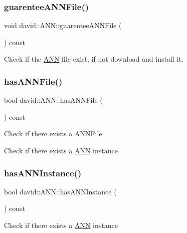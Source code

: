 \subsubsection{\texorpdfstring{guarentee\+A\+N\+N\+File()}{guarenteeANNFile()}}
{\footnotesize\ttfamily void david\+::\+A\+N\+N\+::guarentee\+A\+N\+N\+File (\begin{DoxyParamCaption}{ }\end{DoxyParamCaption}) const}

Check if the \hyperlink{classdavid_1_1ANN}{A\+NN} file exist, if not download and install it. \mbox{\label{classdavid_1_1ANN_a41cd1506fa1d9c4a92f356689ba3160e}} 
\subsubsection{\texorpdfstring{has\+A\+N\+N\+File()}{hasANNFile()}}
{\footnotesize\ttfamily bool david\+::\+A\+N\+N\+::has\+A\+N\+N\+File (\begin{DoxyParamCaption}{ }\end{DoxyParamCaption}) const}

Check if there exists a A\+N\+N\+File

Check if there exists a \hyperlink{classdavid_1_1ANN}{A\+NN} instance \mbox{\label{classdavid_1_1ANN_a0e3b3e683ad786e3ac5f08e26ddcd4ce}} 
\subsubsection{\texorpdfstring{has\+A\+N\+N\+Instance()}{hasANNInstance()}}
{\footnotesize\ttfamily bool david\+::\+A\+N\+N\+::has\+A\+N\+N\+Instance (\begin{DoxyParamCaption}{ }\end{DoxyParamCaption}) const}

Check if there exists a \hyperlink{classdavid_1_1ANN}{A\+NN} instance \mbox{\label{classdavid_1_1ANN_a5a25f7fb14c8681f7fcbda5d447b0a8e}} 
